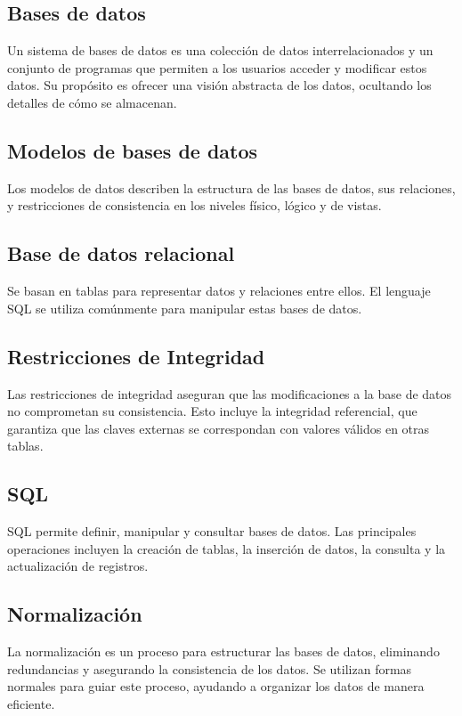 \begin{center}
    \section{ Bases de datos }

    Un sistema de bases de datos es una colección de datos interrelacionados 
    y un conjunto de programas que permiten a los usuarios acceder y modificar 
    estos datos. Su propósito es ofrecer una visión abstracta de los datos, 
    ocultando los detalles de cómo se almacenan.

    \subsection{Modelos de bases de datos}
    Los modelos de datos describen la estructura de las bases de datos, sus relaciones,
    y restricciones de consistencia en los niveles físico, lógico y de vistas.

    \subsection{Base de datos relacional}
    Se basan en tablas para representar datos y relaciones entre ellos. 
    El lenguaje SQL se utiliza comúnmente para manipular estas bases de datos.

    \subsection{Restricciones de Integridad}

    Las restricciones de integridad aseguran que las modificaciones a la base de datos 
    no comprometan su consistencia. Esto incluye la integridad referencial, que garantiza que 
    las claves externas se correspondan con valores válidos en otras tablas.

    \subsection{SQL}
    SQL permite definir, manipular y consultar bases de datos. Las principales operaciones incluyen 
    la creación de tablas, la inserción de datos, la consulta y la actualización de registros.

    \subsection{Normalización}
    La normalización es un proceso para estructurar las bases de datos, eliminando redundancias y 
    asegurando la consistencia de los datos. Se utilizan formas normales para guiar este proceso, 
    ayudando a organizar los datos de manera eficiente.


\end{center}
